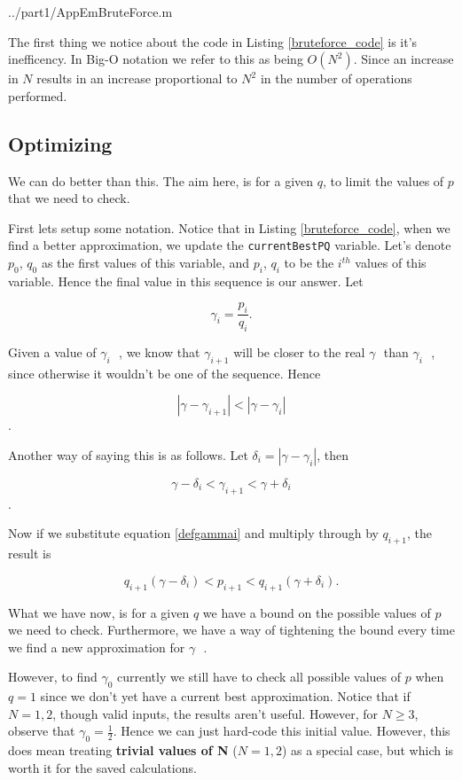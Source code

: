 \documentclass[10pt]{article}
\newcommand*{\gam}{$\gamma \text{ }$}
\newcommand*{\gami}{$\gamma_{i} \text{ }$}
\begin{document}
   {../part1/AppEmBruteForce.m}

The first thing we notice about the code in Listing \ref{bruteforce_code} is it's inefficency. In Big-O notation we refer to this as being $O(N^2)$. Since an increase in $N$ results in an increase proportional to $N^2$ in the number of operations performed.

\subsection{Optimizing}
We can do better than this. The aim here, is for a given $q$, to limit the values of $p$ that we need to check. 

First lets setup some notation. Notice that in Listing \ref{bruteforce_code}, when we find a better approximation, we update the \texttt{currentBestPQ} variable. Let's denote $p_0$, $q_0$  as the first values of this variable, and $p_i$, $q_i$ to be the $i^{th}$ values of this variable. Hence the final value in this sequence is our answer. Let

\begin{equation} \label{defgammai}
  \gamma_i = \frac{p_i}{q_i}.
\end{equation}


Given a value of \gami, we know that $\gamma_{i+1}$ will be closer to the real \gam than \gami, since otherwise it wouldn't be one of the sequence. Hence

$$ |\gamma- \gamma_{i+1}| < |\gamma - \gamma_{i}| $$.

Another way of saying this is as follows. Let $\delta_{i} = | \gamma - \gamma_i  |$, then

$$ \gamma - \delta_i < \gamma_{i+1} < \gamma + \delta_i $$.

Now if we substitute equation \ref{defgammai} and multiply through by $q_{i+1}$, the result is

\begin{equation} \label{em_constraint}
q_{i+1} (\gamma - \delta_i) < p_{i+1} < q_{i+1} ( \gamma + \delta_i ).
\end{equation} 

What we have now, is for a given $q$ we have a bound on the possible values of $p$ we need to check. Furthermore, we have a way of tightening the bound every time we find a new approximation for \gam.

However, to find $\gamma_0$ currently we still have to check all possible values of $p$ when $q = 1$ since we don't yet have a current best approximation. Notice that if $N = 1,2$, though valid inputs, the results aren't useful. However, for $N \geq 3$, observe that $\gamma_0 = \frac{1}{2}$. Hence we can just hard-code this initial value. However, this does mean treating \textbf{trivial values of N} ($N = 1,2$) as a special case, but which is worth it for the saved calculations.
\end{document}

